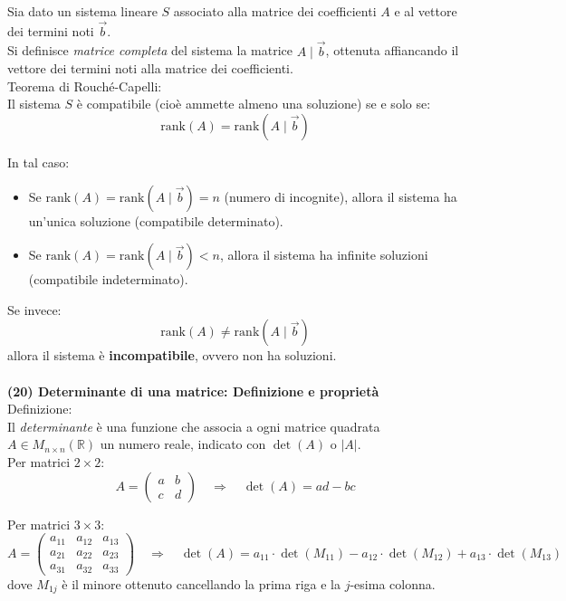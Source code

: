 \documentclass[10pt]{extarticle}
\begin{document}
Sia dato un sistema lineare $S$ associato alla matrice dei coefficienti $A$ e al vettore dei termini noti $\vec{b}$.\\
Si definisce \textit{matrice completa} del sistema la matrice $A \mid \vec{b}$, ottenuta affiancando il vettore dei termini noti alla matrice dei coefficienti. \\
Teorema di Rouché-Capelli:\\
Il sistema $S$ è compatibile (cioè ammette almeno una soluzione) se e solo se:
\[
\text{rank}(A) = \text{rank}(A \mid \vec{b})
\]

In tal caso:
\begin{itemize}
    \item Se $\text{rank}(A) = \text{rank}(A \mid \vec{b}) = n$ (numero di incognite), allora il sistema ha un’unica soluzione (compatibile determinato).
    \item Se $\text{rank}(A) = \text{rank}(A \mid \vec{b}) < n$, allora il sistema ha infinite soluzioni (compatibile indeterminato).
\end{itemize}

Se invece:
\[
\text{rank}(A) \ne \text{rank}(A \mid \vec{b})
\]
allora il sistema è \textbf{incompatibile}, ovvero non ha soluzioni. \\
\vspace{1em}\\
\textbf{(20) Determinante di una matrice: Definizione e proprietà}\\

Definizione:\\
Il \textit{determinante} è una funzione che associa a ogni matrice quadrata $A \in M_{n \times n}(\mathbb{R})$ un numero reale, indicato con $\det(A)$ o $|A|$.\\

Per matrici $2 \times 2$:
\[
A = \begin{pmatrix}
a & b \\
c & d
\end{pmatrix}
\quad \Rightarrow \quad
\det(A) = ad - bc
\]

Per matrici $3 \times 3$:
\[
A = \begin{pmatrix}
a_{11} & a_{12} & a_{13} \\
a_{21} & a_{22} & a_{23} \\
a_{31} & a_{32} & a_{33}
\end{pmatrix}
\quad \Rightarrow \quad
\det(A) = a_{11} \cdot \det(M_{11}) - a_{12} \cdot \det(M_{12}) + a_{13} \cdot \det(M_{13})
\]
dove $M_{1j}$ è il minore ottenuto cancellando la prima riga e la $j$-esima colonna.
\end{document}
